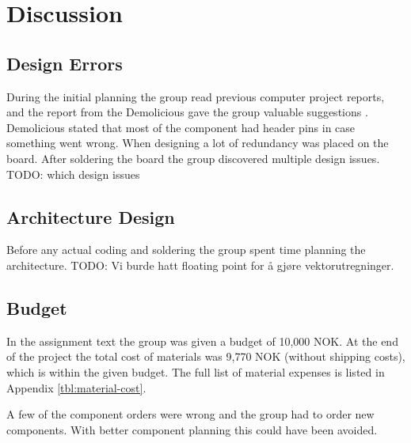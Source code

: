 \chapter{Discussion}

\section{Design Errors}
During the initial planning the group read previous computer project reports,
and the report from the Demolicious gave the group valuable suggestions \cite{demolicious-report}.
Demolicious stated that most of the component had header pins in case something went wrong.
When designing a lot of redundancy was placed on the board.
After soldering the board the group discovered multiple design issues. TODO: which design issues

\section{Architecture Design}
Before any actual coding and soldering the group spent time planning the architecture.
TODO: Vi burde hatt floating point for å gjøre vektorutregninger.

\section{Budget}
In the assignment text the group was given a budget of 10,000 NOK.
At the end of the project the total cost of materials was 9,770 NOK (without shipping costs), which is within the given budget.
The full list of material expenses is listed in Appendix \ref{tbl:material-cost}.

A few of the component orders were wrong and the group had to order new components.
With better component planning this could have been avoided.


